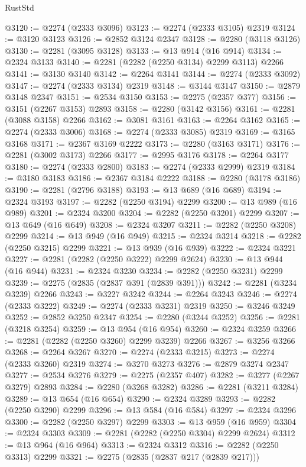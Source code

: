 \begin{lexlean}{RustStd}
\begin{coremodule}
{\begin{coremodule}
{{{{{{{{{{{{{{@3120 := @2274 (@2333 @3096)
@3123 := @2274 (@2333 @3105) @2319
@3124 := @3120 @3123
@3126 := @2852 @3124 @2347
@3128 := @2280 (@3118 @3126)
@3130 := @2281 (@3095 @3128)
@3133 := @13 @914 (@16 @914)
@3134 := @2324 @3133
@3140 := @2281 (@2282 (@2250 @3134) @2299 @3113) @2266
@3141 := @3130 @3140
@3142 := @2264 @3141
@3144 := @2274 (@2333 @3092)
@3147 := @2274 (@2333 @3134) @2319
@3148 := @3144 @3147
@3150 := @2879 @3148 @2347
@3151 := @2534 @3150
@3153 := @2275 (@2357 @377)
@3156 := @3151 (@2267 @3153) @2893
@3158 := @2280 (@3142 @3156)
@3161 := @2281 (@3088 @3158) @2266
@3162 := @3081 @3161
@3163 := @2264 @3162
@3165 := @2274 (@2333 @3006)
@3168 := @2274 (@2333 @3085) @2319
@3169 := @3165 @3168
@3171 := @2367 @3169 @2222
@3173 := @2280 (@3163 @3171)
@3176 := @2281 (@3002 @3173) @2266
@3177 := @2995 @3176
@3178 := @2264 @3177
@3180 := @2274 (@2333 @2800)
@3183 := @2274 (@2333 @2999) @2319
@3184 := @3180 @3183
@3186 := @2367 @3184 @2222
@3188 := @2280 (@3178 @3186)
@3190 := @2281 (@2796 @3188)
@3193 := @13 @689 (@16 @689)
@3194 := @2324 @3193
@3197 := @2282 (@2250 @3194) @2299
@3200 := @13 @989 (@16 @989)
@3201 := @2324 @3200
@3204 := @2282 (@2250 @3201) @2299
@3207 := @13 @649 (@16 @649)
@3208 := @2324 @3207
@3211 := @2282 (@2250 @3208) @2299
@3214 := @13 @949 (@16 @949)
@3215 := @2324 @3214
@3218 := @2282 (@2250 @3215) @2299
@3221 := @13 @939 (@16 @939)
@3222 := @2324 @3221
@3227 := @2281 (@2282 (@2250 @3222) @2299 @2624)
@3230 := @13 @944 (@16 @944)
@3231 := @2324 @3230
@3234 := @2282 (@2250 @3231) @2299
@3239 := @2275 (@2835 (@2837 @391 (@2839 @391)))
@3242 := @2281 (@3234 @3239) @2266
@3243 := @3227 @3242
@3244 := @2264 @3243
@3246 := @2274 (@2333 @3222)
@3249 := @2274 (@2333 @3231) @2319
@3250 := @3246 @3249
@3252 := @2852 @3250 @2347
@3254 := @2280 (@3244 @3252)
@3256 := @2281 (@3218 @3254)
@3259 := @13 @954 (@16 @954)
@3260 := @2324 @3259
@3266 := @2281 (@2282 (@2250 @3260) @2299 @3239) @2266
@3267 := @3256 @3266
@3268 := @2264 @3267
@3270 := @2274 (@2333 @3215)
@3273 := @2274 (@2333 @3260) @2319
@3274 := @3270 @3273
@3276 := @2879 @3274 @2347
@3277 := @2534 @3276
@3279 := @2275 (@2357 @407)
@3282 := @3277 (@2267 @3279) @2893
@3284 := @2280 (@3268 @3282)
@3286 := @2281 (@3211 @3284)
@3289 := @13 @654 (@16 @654)
@3290 := @2324 @3289
@3293 := @2282 (@2250 @3290) @2299
@3296 := @13 @584 (@16 @584)
@3297 := @2324 @3296
@3300 := @2282 (@2250 @3297) @2299
@3303 := @13 @959 (@16 @959)
@3304 := @2324 @3303
@3309 := @2281 (@2282 (@2250 @3304) @2299 @2624)
@3312 := @13 @964 (@16 @964)
@3313 := @2324 @3312
@3316 := @2282 (@2250 @3313) @2299
@3321 := @2275 (@2835 (@2837 @217 (@2839 @217)))
}}}}}}}}}}}}}}
\end{coremodule}}
\end{coremodule}
\end{lexlean}
